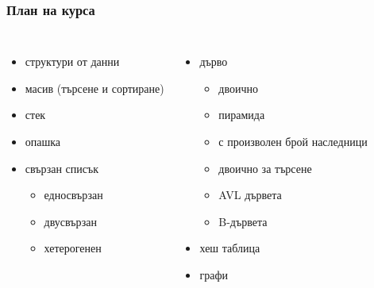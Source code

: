 \documentclass[alsotrans,beameroptions={aspectratio=169}]{beamerswitch}
\begin{document}
\begin{frame}
  \frametitle{План на курса}

  \begin{columns}[t,onlytextwidth]

    \begin{itemize}
    \item структури от данни
    \item масив (търсене и сортиране)
    \item стек
    \item опашка
    \item свързан списък
      \begin{itemize}
      \item едносвързан
      \item двусвързан
      \item хетерогенен
      \end{itemize}
    \end{itemize}


    \begin{itemize}
    \item дърво
      \begin{itemize}
      \item двоично
      \item пирамида
      \item с произволен брой наследници
      \item двоично за търсене
      \item AVL дървета
      \item B-дървета
      \end{itemize}
    \item хеш таблица
    \item графи
    \end{itemize}
  \end{columns}
\end{frame}
\end{document}
